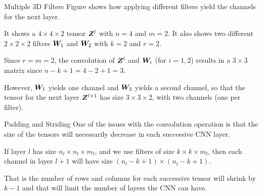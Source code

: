 %
%
%
%
\begin{frame}{Multiple 3D Filters}
Figure shows how applying different filters
    yield the channels for the next layer. 

\medskip

It shows a $4 \times 4 \times
    2$ tensor ${\boldsymbol Z}^l$ with $n=4$ and $m=2$. It also shows two different $2
    \times 2 \times 2$ 
    filters ${\boldsymbol W}_1$ and ${\boldsymbol W}_2$ with $k=2$ and $r=2$. 

\medskip

Since $r=m=2$, the
    convolution of ${\boldsymbol Z}^l$ and ${\boldsymbol W}_i$ (for $i=1,2$) results in a $3
    \times 3$ matrix since $n-k+1 = 4-2+1 = 3$. 

\medskip

However, ${\boldsymbol W}_1$ yields
    one channel and ${\boldsymbol W}_2$ yields a second channel, so that the tensor
    for the next layer ${\boldsymbol Z}^{l+1}$ has size $3 \times 3 \times 2$, with two
    channels (one per filter).
\end{frame}
%
\begin{frame}{Padding and Striding}
One of the issues with the convolution operation is
that the size of the tensors will necessarily decrease in each
successive CNN layer. 

\medskip

If layer $l$ has size $n_l \times n_l \times m_l$,
and we use filters of size $k \times k \times m_l$, then each channel in
layer $l+1$ will have size $(n_l -k +1) \times (n_l -k +1)$. 

\medskip

That is the
number of rows and columns for each successive tensor will shrink by
$k-1$
and that will limit the number of layers the CNN can have. 
\end{frame}
